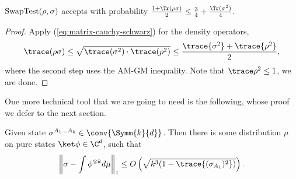 \begin{claim}\label{fact:swap-test}
  $\textup{SwapTest}(\rho, \sigma)$ accepts with probability $\frac{1 + \Tr(\rho\sigma)}{2} \le \frac{3}{4} + \frac{\Tr(\sigma^2)}{4}$.
\end{claim}
\begin{proof}
Apply (\ref{eq:matrix-cauchy-schwarz}) for the density operators,
\begin{align*}
    \trace(\rho \sigma) \le \sqrt{\trace(\sigma^2) \cdot \trace(\rho^2)} \le \frac{\trace{\sigma^2}+\trace{\rho^2}}{2},
\end{align*}
where the second step uses the AM-GM inequality. Note that $\trace\rho^2\le 1$, we are done.
\end{proof}

One more technical tool that we are going to need is the following, whose proof we defer to the next section.
\begin{theorem}\label{thm:de-Finnetti-type-1}
Given state $\sigma^{A_1\ldots A_k}\in \conv{\Symm{k}{d}}$. 
Then there is some distribution $\mu$ on pure states $\ket\phi\in\C^d$, such that
\begin{align*}
    \left\|
        \sigma - \int \phi^{\otimes k} d\mu
    \right\|_1 \le O\left(\sqrt{k^3(1-\trace{(\sigma_{A_1})^2}) }\right).
\end{align*}
\end{theorem}


